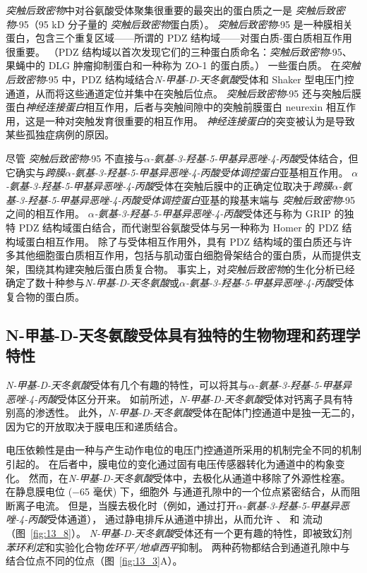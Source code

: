 \textit{突触后致密物}中对谷氨酸受体聚集很重要的最突出的蛋白质之一是 \textit{突触后致密物}-95（95 kD 分子量的 \textit{突触后致密物}蛋白质）。
\textit{突触后致密物}-95 是一种膜相关蛋白，包含三个重复区域——所谓的 PDZ 结构域——对蛋白质-蛋白质相互作用很重要。
（PDZ 结构域以首次发现它们的三种蛋白质命名：\textit{突触后致密物}-95、果蝇中的 DLG 肿瘤抑制蛋白和一种称为 ZO-1 的蛋白质。） 一些蛋白质。
在\textit{突触后致密物}-95 中，PDZ 结构域结合\textit{N-甲基-D-天冬氨酸}受体和 Shaker 型电压门控  通道，从而将这些通道定位并集中在突触后位点。
\textit{突触后致密物}-95 还与突触后膜蛋白\textit{神经连接蛋白}相互作用，后者与突触间隙中的突触前膜蛋白 neurexin 相互作用，这是一种对突触发育很重要的相互作用。
\textit{神经连接蛋白}的突变被认为是导致某些孤独症病例的原因。


尽管 \textit{突触后致密物}-95 不直接与\textit{$\alpha$-氨基-3-羟基-5-甲基异恶唑-4-丙酸}受体结合，但它确实与\textit{跨膜$\alpha$-氨基-3-羟基-5-甲基异恶唑-4-丙酸受体调控蛋白}亚基相互作用。
\textit{$\alpha$-氨基-3-羟基-5-甲基异恶唑-4-丙酸}受体在突触后膜中的正确定位取决于\textit{跨膜$\alpha$-氨基-3-羟基-5-甲基异恶唑-4-丙酸受体调控蛋白}亚基的羧基末端与 \textit{突触后致密物}-95 之间的相互作用。
\textit{$\alpha$-氨基-3-羟基-5-甲基异恶唑-4-丙酸}受体还与称为 GRIP 的独特 PDZ 结构域蛋白结合，而代谢型谷氨酸受体与另一种称为 Homer 的 PDZ 结构域蛋白相互作用。
除了与受体相互作用外，具有 PDZ 结构域的蛋白质还与许多其他细胞蛋白质相互作用，包括与肌动蛋白细胞骨架结合的蛋白质，从而提供支架，围绕其构建突触后蛋白质复合物。
事实上，对\textit{突触后致密物}的生化分析已经确定了数十种参与\textit{N-甲基-D-天冬氨酸}或\textit{$\alpha$-氨基-3-羟基-5-甲基异恶唑-4-丙酸}受体复合物的蛋白质。



\subsection{N-甲基-D-天冬氨酸受体具有独特的生物物理和药理学特性}

\textit{N-甲基-D-天冬氨酸}受体有几个有趣的特性，可以将其与\textit{$\alpha$-氨基-3-羟基-5-甲基异恶唑-4-丙酸}受体区分开来。
如前所述，\textit{N-甲基-D-天冬氨酸}受体对钙离子具有特别高的渗透性。
此外，\textit{N-甲基-D-天冬氨酸}受体在配体门控通道中是独一无二的，因为它的开放取决于膜电压和递质结合。


电压依赖性是由一种与产生动作电位的电压门控通道所采用的机制完全不同的机制引起的。
在后者中，膜电位的变化通过固有电压传感器转化为通道中的构象变化。
然而，在\textit{N-甲基-D-天冬氨酸}受体中，去极化从通道中移除了外源性栓塞。
在静息膜电位 (−65 毫伏) 下，细胞外  与通道孔隙中的一个位点紧密结合，从而阻断离子电流。
但是，当膜去极化时（例如，通过打开\textit{$\alpha$-氨基-3-羟基-5-甲基异恶唑-4-丙酸}受体通道）， 通过静电排斥从通道中排出，从而允许 、 和  流动（图~\ref{fig:13_8}）。 
\textit{N-甲基-D-天冬氨酸}受体还有一个更有趣的特性，即被致幻剂\textit{苯环利定}和实验化合物\textit{佐环平/地卓西平}抑制。
两种药物都结合到通道孔隙中与  结合位点不同的位点（图~\ref{fig:13_3}A）。


